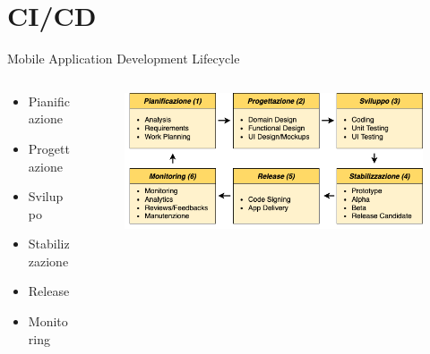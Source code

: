 
\section{CI/CD}
    \begin{frame}{Mobile Application Development Lifecycle}
        \begin{columns}[onlytextwidth]
            \begin{column}{0.4\textwidth}
                \begin{itemize}
                    \item Pianificazione
                    \item Progettazione
                    \item Sviluppo
                    \item Stabilizzazione
                    \item Release
                    \item Monitoring
                \end{itemize}
            \end{column}
            \begin{column}{0.6\textwidth}
                \begin{figure}[H]
                    \centering
                    \includegraphics[width=1\textwidth]{img/tesi-2-Page-9.drawio.png}
                \end{figure}    
            \end{column}
       \end{columns}
    \end{frame}


